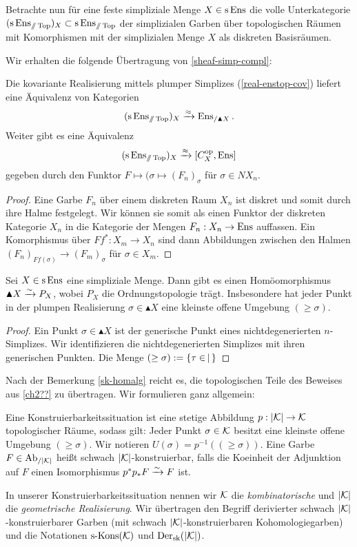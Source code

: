 Betrachte nun für eine feste simpliziale Menge $X \in \operatorname{s}\operatorname{Ens}$ die
volle Unterkategorie $(\operatorname{s}\operatorname{Ens}_{\mathbin{/\mkern-6mu/} \operatorname{Top}})_X \subset \operatorname{s}\operatorname{Ens}_{\mathbin{/\mkern-6mu/} \operatorname{Top}}$ der
simplizialen Garben über topologischen Räumen mit Komorphismen mit der
simplizialen Menge $X$ als diskreten Basisräumen.

Wir erhalten die folgende Übertragung von \ref{sheaf-simp-compl}:
\begin{prop}
  Die kovariante Realisierung mittels plumper Simplizes
  (\ref{real-enstop-cov}) liefert eine Äquivalenz von Kategorien
  \[ (\operatorname{s}\operatorname{Ens}_{\mathbin{/\mkern-6mu/} \operatorname{Top}})_X \xrightarrow{\approx} \operatorname{Ens}_{/\blacktriangle X}. \]
  Weiter gibt es eine Äquivalenz
  \[ (\operatorname{s}\operatorname{Ens}_{\mathbin{/\mkern-6mu/} \operatorname{Top}})_X \xrightarrow{\approx} [C_X^\mathrm{op}, \operatorname{Ens}] \]
  gegeben durch den Funktor $F \mapsto (\sigma \mapsto (F_n)_\sigma$
  für $\sigma \in NX_n$.
\end{prop}
\begin{proof}
  Eine Garbe $F_n$ über einem diskreten Raum $X_n$ ist diskret und
  somit durch ihre Halme festgelegt. Wir können sie somit als einen
  Funktor der diskreten Kategorie $X_n$ in die Kategorie der Mengen
  $F_n: X_n \to \operatorname{Ens}$ auffassen. Ein Komorphismus über $Ff^*: X_m \to
  X_n$ sind dann Abbildungen zwischen den Halmen $(F_n)_{Ff(\sigma)}
  \to (F_m)_\sigma$ für $\sigma \in X_m$.
\end{proof}

\begin{lemma}
  Sei $X \in \operatorname{s}\operatorname{Ens}$ eine simpliziale Menge. Dann gibt es einen
  Homöomorphismus $\blacktriangle X \xrightarrow[]{\sim} P_X$, wobei $P_X$ die
  Ordnungstopologie trägt. Insbesondere hat jeder Punkt in der plumpen
  Realisierung $\sigma \in \blacktriangle X$ eine kleinste offene
  Umgebung $(\geq \sigma)$.
\end{lemma}
\begin{proof}
  Ein Punkt $\sigma \in \blacktriangle X$ ist der generische Punkt
  eines nichtdegenerierten $n$-Simplizes. Wir identifizieren die
  nichtdegenerierten Simplizes mit ihren generischen Punkten. Die
  Menge $(\geq \sigma) := \left\{ \tau \in \,\middle|\,  \right\}$
\end{proof}

Nach der Bemerkung \ref{sk-homalg} reicht es, die topologischen Teile
des Beweises aus \ref{ch2??} zu übertragen. Wir formulieren ganz
allgemein:
\begin{defn}
  Eine Konstruierbarkeitssituation ist eine stetige Abbildung $p: |\mathcal{K}|
  \to \mathcal{K}$ topologischer Räume, sodass gilt: Jeder Punkt $\sigma \in
  \mathcal{K}$ besitzt eine kleinste offene Umgebung $(\geq \sigma)$. Wir
  notieren $U(\sigma) = p^{-1}((\geq \sigma))$. Eine Garbe $F \in
  \operatorname{Ab}_{/|\mathcal{K}|}$ heißt schwach $|\mathcal{K}|$-konstruierbar, falls die Koeinheit der
  Adjunktion auf $F$ einen Isomorphismus $p^* p_* F \xrightarrow[]{\sim} F$ ist.
\end{defn}
In unserer Konstruierbarkeitssituation nennen wir $\mathcal{K}$ die
\emph{kombinatorische} und $|\mathcal{K}|$ die \emph{geometrische
  Realisierung}. Wir übertragen den Begriff derivierter schwach
$|\mathcal{K}|$-konstruierbarer Garben (mit schwach $|\mathcal{K}|$-konstruierbaren
Kohomologiegarben) und die Notationen $\operatorname{s-Kons}(\mathcal{K})$ und $\operatorname{Der}_{\mathrm{sk}}(|\mathcal{K}|)$.

